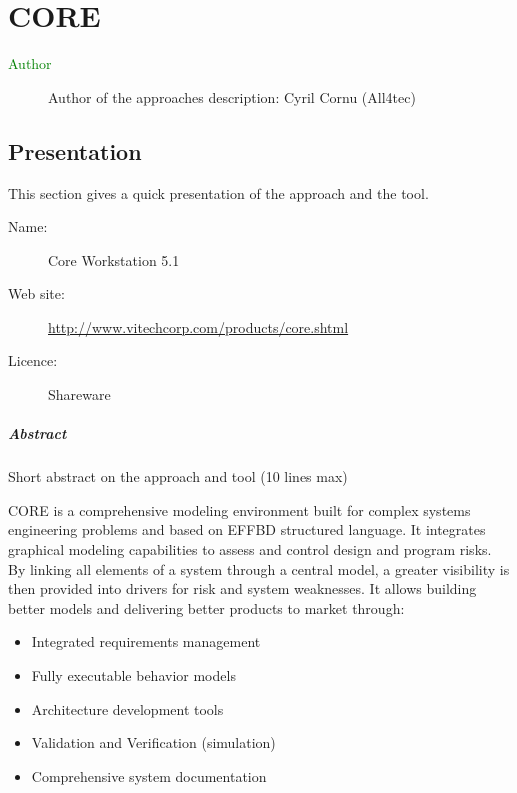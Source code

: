 \chapter{CORE}
\label{sec:core}


\begin{description}
\item[\textcolor{green}{Author}] Author of the approaches description: Cyril Cornu (All4tec)
\end{description}


\section{Presentation}

This section gives a quick presentation of the approach and the tool.

\begin{description}
\item[Name:] Core Workstation 5.1
\item[Web site: ] \url{http://www.vitechcorp.com/products/core.shtml}
\item[Licence: ] Shareware
\end{description}

\paragraph{Abstract} Short abstract on the approach and tool (10 lines max)

CORE is a comprehensive modeling environment built for complex systems engineering problems and based on EFFBD structured language.
It integrates graphical modeling capabilities to assess and control design and program risks. By linking all elements of a system through a central model, a greater visibility is then provided into drivers for risk and system weaknesses. It allows building better models and delivering better products to market through:
\begin{itemize}
\item Integrated requirements management
\item  Fully executable behavior models
\item Architecture development tools
\item Validation and Verification (simulation)
\item Comprehensive system documentation
\end{itemize}



